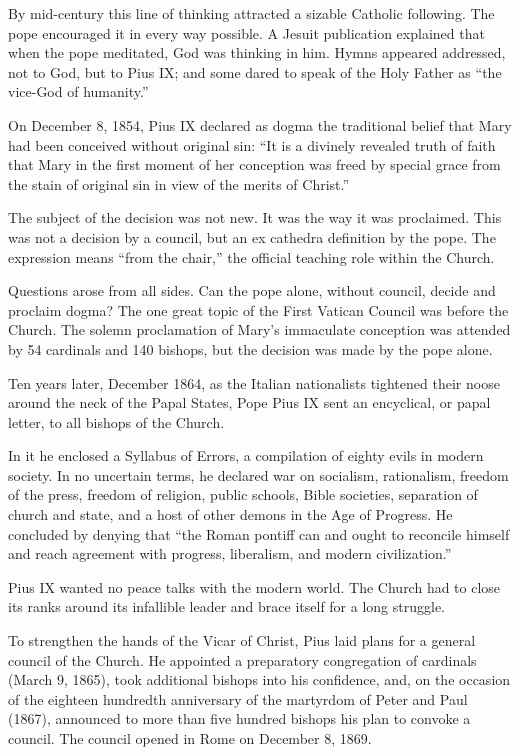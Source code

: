By mid-century this line of thinking attracted a sizable Catholic following. The pope encouraged it
in every way possible. A Jesuit publication explained that when the pope meditated, God was thinking
in him. Hymns appeared addressed, not to God, but to Pius IX; and some dared to speak of the Holy
Father as “the vice-God of humanity.”

On December 8, 1854, Pius IX declared as dogma the traditional belief that Mary had been conceived
without original sin: “It is a divinely revealed truth of faith that Mary in the first moment of her
conception was freed by special grace from the stain of original sin in view of the merits of
Christ.”

The subject of the decision was not new. It was the way it was proclaimed. This was not a decision
by a council, but an ex cathedra definition by the pope. The expression means “from the chair,” the
official teaching role within the Church.

Questions arose from all sides. Can the pope alone, without council, decide and proclaim dogma? The
one great topic of the First Vatican Council was before the Church. The solemn proclamation of
Mary’s immaculate conception was attended by 54 cardinals and 140 bishops, but the decision was made
by the pope alone.

Ten years later, December 1864, as the Italian nationalists tightened their noose around the neck of
the Papal States, Pope Pius IX sent an encyclical, or papal letter, to all bishops of the Church.

In it he enclosed a Syllabus of Errors, a compilation of eighty evils in modern society. In no
uncertain terms, he declared war on socialism, rationalism, freedom of the press, freedom of
religion, public schools, Bible societies, separation of church and state, and a host of other
demons in the Age of Progress. He concluded by denying that “the Roman pontiff can and ought to
reconcile himself and reach agreement with progress, liberalism, and modern civilization.”

Pius IX wanted no peace talks with the modern world. The Church had to close its ranks around its
infallible leader and brace itself for a long struggle.

To strengthen the hands of the Vicar of Christ, Pius laid plans for a general council of the Church.
He appointed a preparatory congregation of cardinals (March 9, 1865), took additional bishops into
his confidence, and, on the occasion of the eighteen hundredth anniversary of the martyrdom of Peter
and Paul (1867), announced to more than five hundred bishops his plan to convoke a council. The
council opened in Rome on December 8, 1869.

